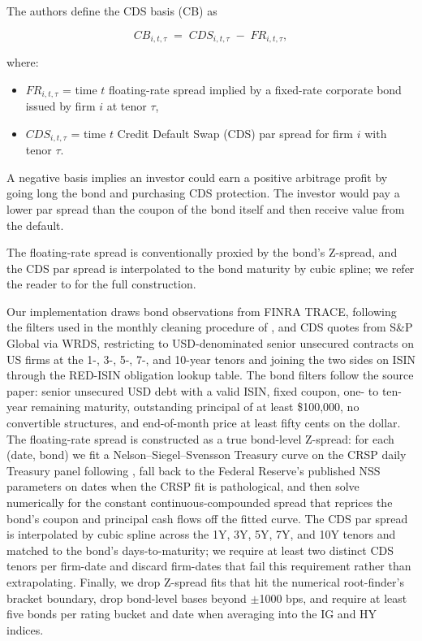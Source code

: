 \documentclass{article}
\begin{document}
\begin{appendices}
The authors define the CDS basis (CB) as

\begin{equation}
  CB_{i,t,\tau} \;=\; CDS_{i,t,\tau} \;-\; FR_{i,t,\tau},
\end{equation}

where:
\begin{itemize}
  \item $FR_{i,t,\tau}$ = time $t$ floating-rate spread implied by a fixed-rate corporate bond issued by firm $i$ at tenor $\tau$,
  \item $CDS_{i,t,\tau}$ = time $t$ Credit Default Swap (CDS) par spread for firm $i$ with tenor $\tau$.
\end{itemize}

A negative basis implies an investor could earn a positive arbitrage profit by going long the bond and purchasing CDS protection. 
The investor would pay a lower par spread than the coupon of the bond itself and then receive value from the default.

The floating-rate spread is conventionally proxied by the bond's Z-spread, and the CDS par spread is interpolated to the bond maturity by cubic spline; we refer the reader to \citet{Siriwardane2021} for the full construction.

Our implementation draws bond observations from FINRA TRACE, following the filters used in the monthly cleaning procedure of \citet{Dickerson2024}, and CDS quotes from S\&P Global via WRDS, restricting to USD-denominated senior unsecured contracts on US firms at the 1-, 3-, 5-, 7-, and 10-year tenors and joining the two sides on ISIN through the RED-ISIN obligation lookup table. The bond filters follow the source paper: senior unsecured USD debt with a valid ISIN, fixed coupon, one- to ten-year remaining maturity, outstanding principal of at least \$100{,}000, no convertible structures, and end-of-month price at least fifty cents on the dollar. The floating-rate spread is constructed as a true bond-level Z-spread: for each (date, bond) we fit a Nelson--Siegel--Svensson Treasury curve on the CRSP daily Treasury panel following \citet{Gurkaynak2007}, fall back to the Federal Reserve's published NSS parameters on dates when the CRSP fit is pathological, and then solve numerically for the constant continuous-compounded spread that reprices the bond's coupon and principal cash flows off the fitted curve. The CDS par spread is interpolated by cubic spline across the 1Y, 3Y, 5Y, 7Y, and 10Y tenors and matched to the bond's days-to-maturity; we require at least two distinct CDS tenors per firm-date and discard firm-dates that fail this requirement rather than extrapolating. Finally, we drop Z-spread fits that hit the numerical root-finder's bracket boundary, drop bond-level bases beyond \(\pm\)1000 bps, and require at least five bonds per rating bucket and date when averaging into the IG and HY indices.


\end{appendices}
\end{document}
